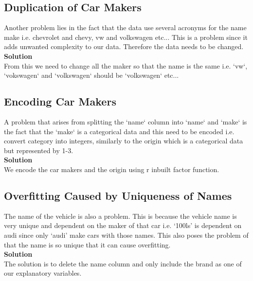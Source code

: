 \documentclass[11pt]{article} %
\begin{document}
\subsection{Duplication of Car Makers}
Another problem lies in the fact that the data use several acronyms for the name make i.e. chevrolet and chevy, vw and volkswagen etc... This is a problem since it adds unwanted complexity to our data. Therefore the data needs to be changed.\\
\textbf{Solution}\\
From this we need to change all the maker so that the name is the same i.e. `vw`, `vokswagen` and `volkswagen` should be `volkswagen` etc...

\subsection{Encoding Car Makers}
A problem that arises from splitting the `name` column into `name` and `make` is the fact that the `make` is a categorical data and this need to be encoded i.e. convert category into integers, similarly to the origin which is a categorical data but represented by 1-3.\\
\textbf{Solution}\\
We encode the car makers and the origin using r inbuilt factor function.
\subsection{Overfitting Caused by Uniqueness of Names}
The name of the vehicle is also a problem. This is because the vehicle name is very unique and dependent on the maker of that car i.e. `100ls' is dependent on audi since only `audi' make cars with those names. This also poses the problem of that the name is so unique that it can cause overfitting.\\ 
\textbf{Solution}\\
The solution is to delete the name column and only include the brand as one of our explanatory variables.
\end{document}
